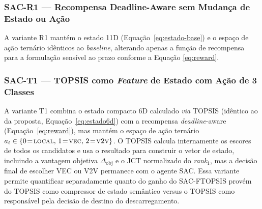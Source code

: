 \subsubsection*{SAC-R1 — Recompensa Deadline-Aware sem Mudança de Estado ou Ação}

A variante R1 mantém o estado 11D (Equação~\ref{eq:estado-base}) e o espaço de ação ternário idênticos ao \textit{baseline}, alterando apenas a função de recompensa para a formulação sensível ao prazo conforme a Equação \ref{eq:reward}.


\subsubsection*{\gls{SAC}-T1 — \texorpdfstring{\gls{TOPSIS}}{\gls{TOPSIS}} como \textit{Feature} de Estado com Ação de 3 Classes}

A variante T1 combina o estado compacto 6D calculado \emph{via} \gls{TOPSIS} (idêntico ao da proposta, Equação~\ref{eq:estado6d}) com a recompensa \textit{deadline}-aware (Equação~\ref{eq:reward}), mas mantém o espaço de ação ternário $a_t \in \{0\!=\!\textsc{local},\, 1\!=\!\textsc{vec},\, 2\!=\!\textsc{v2v}\}$. O \gls{TOPSIS} calcula internamente os escores de todos os candidatos e usa o resultado para construir o vetor de estado, incluindo a vantagem objetiva $\Delta_{\text{obj}}$ e o \gls{JCT} normalizado do \textit{rank}$_1$, mas a decisão final de escolher \gls{VEC} ou \gls{V2V} permanece com o agente \gls{SAC}. Essa variante permite quantificar separadamente quanto do ganho do \gls{SAC}-FTOPSIS provém do \gls{TOPSIS} como compressor de estado semântico versus o \gls{TOPSIS} como responsável pela decisão de destino do descarregamento.

